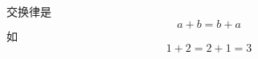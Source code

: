 \documentclass[nofonts]{ctexbook}
\begin{document}
交换律是
\[
	a+b=b+a
\]
如
$$
	1+2=2+1=3
$$
\end{document}
